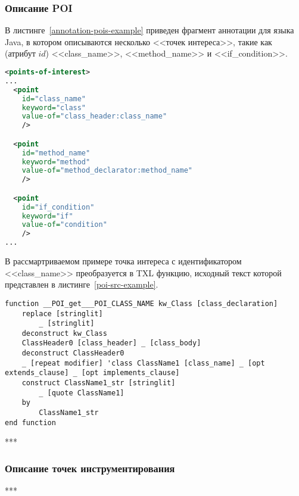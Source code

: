 \subsubsection{Описание POI}

В листинге~\ref{annotation-pois-example} приведен фрагмент аннотации для языка Java, в котором описываются несколько <<точек интереса>>, такие как (атрибут $id$) <<class\_name>>, <<method\_name>> и <<if\_condition>>.

\begin{lstlisting}[frame=single, language=XML, label={annotation-pois-example}, caption={Пример}]
<points-of-interest>
...
  <point
    id="class_name"
    keyword="class"
    value-of="class_header:class_name"
    />

  <point
    id="method_name"
    keyword="method"
    value-of="method_declarator:method_name"
    />

  <point
    id="if_condition"
    keyword="if"
    value-of="condition"
    />
...
\end{lstlisting}

В рассмартриваемом примере точка интереса с идентификатором <<class\_name>> преобразуется в TXL функцию, исходный текст которой представлен в листинге~\ref{poi-src-example}.

\begin{lstlisting}[frame=single, language=TXL, label={poi-src-example}, caption={Пример синтезированной функции для точки интереса <<class\_name>>}]
function __POI_get___POI_CLASS_NAME kw_Class [class_declaration]
	replace [stringlit]
		_ [stringlit]
	deconstruct kw_Class
    ClassHeader0 [class_header] _ [class_body]
	deconstruct ClassHeader0
    _ [repeat modifier] 'class ClassName1 [class_name] _ [opt extends_clause] _ [opt implements_clause]
	construct ClassName1_str [stringlit]
		_ [quote ClassName1]
	by
		ClassName1_str
end function
\end{lstlisting}

***

\subsubsection{Описание точек инструментирования}

***

